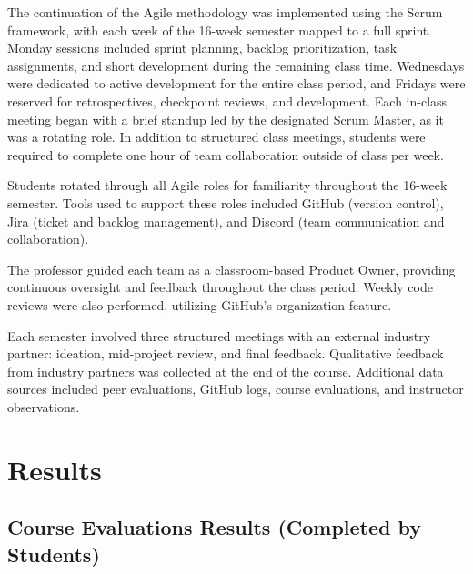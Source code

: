 \documentclass{article}
\begin{document}
The continuation of the Agile methodology was implemented using the Scrum framework, with each week of the 16-week semester mapped to a full sprint. Monday sessions included sprint planning, backlog prioritization, task assignments, and short development during the remaining class time. Wednesdays were dedicated to active development for the entire class period, and Fridays were reserved for retrospectives, checkpoint reviews, and development. Each in-class meeting began with a brief standup led by the designated Scrum Master, as it was a rotating role. In addition to structured class meetings, students were required to complete one hour of team collaboration outside of class per week.

Students rotated through all Agile roles for familiarity throughout the 16-week semester. Tools used to support these roles included GitHub (version control), Jira (ticket and backlog management), and Discord (team communication and collaboration).

The professor guided each team as a classroom-based Product Owner, providing continuous oversight and feedback throughout the class period. Weekly code reviews were also performed, utilizing GitHub's organization feature.

Each semester involved three structured meetings with an external industry partner: ideation, mid-project review, and final feedback. Qualitative feedback from industry partners was collected at the end of the course. Additional data sources included peer evaluations, GitHub logs, course evaluations, and instructor observations.

\section{Results}

\subsection{Course Evaluations Results (Completed by Students)}
\end{document}
